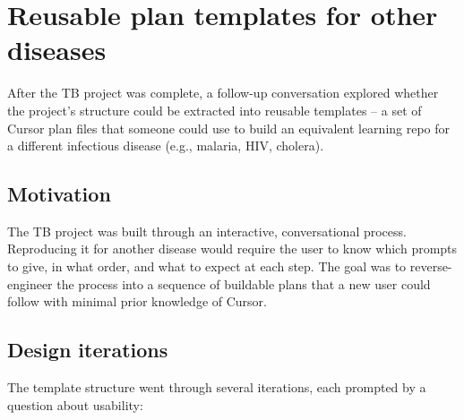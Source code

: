 \documentclass[11pt]{article}
\begin{document}
\section{Reusable plan templates for other diseases}
\label{sec:templates}

After the TB project was complete, a follow-up conversation explored whether the project's structure could be extracted into reusable templates -- a set of Cursor plan files that someone could use to build an equivalent learning repo for a different infectious disease (e.g., malaria, HIV, cholera).

\subsection{Motivation}

The TB project was built through an interactive, conversational process. Reproducing it for another disease would require the user to know which prompts to give, in what order, and what to expect at each step. The goal was to reverse-engineer the process into a sequence of buildable plans that a new user could follow with minimal prior knowledge of Cursor.

\subsection{Design iterations}

The template structure went through several iterations, each prompted by a question about usability:
\end{document}
